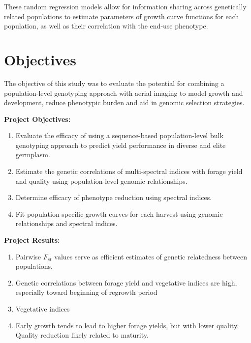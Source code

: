 \documentclass[12pt, letterpaper]{article}
\begin{document}
These random regression models allow for information sharing across genetically related populations to estimate parameters of growth curve functions for each population, as well as their correlation with the end-use phenotype. 



\section*{Objectives}

The objective of this study was to evaluate the potential for combining a population-level genotyping approach with aerial imaging to model growth and development, reduce phenotypic burden and aid in genomic selection strategies. 

\noindent%
\begin{minipage}[h]{.45\textwidth}
\textbf{Project Objectives:}\\
\begin{enumerate}
	  \setlength\itemsep{0.2em}
	\item Evaluate the efficacy of using a sequence-based population-level bulk genotyping approach to predict yield performance in diverse and elite germplasm.

	\item Estimate the genetic correlations of multi-spectral indices with forage yield and quality using population-level genomic relationships. 

	\item Determine efficacy of phenotype reduction using spectral indices.
	
	\item Fit population specific growth curves for each harvest using genomic relationships and spectral indices. 
\end{enumerate}%
\end{minipage}%
\begin{minipage}[h]{.45\textwidth}
\begin{minipage}[h]{.05\textwidth}
\end{minipage}
\textbf{Project Results:}\\
\begin{enumerate}
	  \setlength\itemsep{0.2em}
	\item Pairwise $F_{st}$ values serve as efficient estimates of genetic relatedness between populations.

	\item Genetic correlations between forage yield and vegetative indices are high, especially toward beginning of regrowth period

	\item Vegetative indices 
	
	\item Early growth tends to lead to higher forage yields, but with lower quality. Quality reduction likely related to maturity.

\end{enumerate}%
\vfill
\end{minipage}
\end{document}
